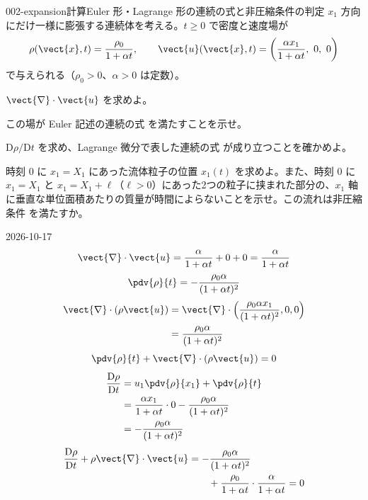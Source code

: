 \documentclass[uplatex,dvipdfmx,a4paper,11pt]{jsarticle}
\begin{document}
\begin{mondai}{002-expansion}{計算}{Euler 形・Lagrange 形の連続の式と非圧縮条件の判定}
$x_1$ 方向にだけ一様に膨張する連続体を考える。$t \ge 0$ で密度と速度場が
  \[ \rho(\vect{x},t) = \frac{\rho_0}{1+\alpha t},\qquad \vect{u}(\vect{x},t) = \left(\frac{\alpha x_1}{1+\alpha t},\ 0,\ 0\right) \]
  で与えられる（$\rho_0>0$、$\alpha>0$ は定数）。
  \begin{shoumon}
    \item $\vect{\nabla}\cdot\vect{u}$ を求めよ。
    \item この場が Euler 記述の連続の式  を満たすことを示せ。
    \item $\mathrm{D}\rho/\mathrm{D}t$ を求め、Lagrange 微分で表した連続の式  が成り立つことを確かめよ。
    \item 時刻 0 に $x_1 = X_1$ にあった流体粒子の位置 $x_1(t)$ を求めよ。また、時刻 0 に $x_1 = X_1$ と $x_1 = X_1 + \ell$（$\ell>0$）にあった2つの粒子に挟まれた部分の、$x_1$ 軸に垂直な単位面積あたりの質量が時間によらないことを示せ。この流れは非圧縮条件  を満たすか。
  \end{shoumon}
\begin{kotaeutsushi}{2026-10-17}
\[ \vect{\nabla}\cdot\vect{u}=\frac{\alpha}{1+\alpha t}+0+0=\frac{\alpha}{1+\alpha t} \]
\[ \pdv{\rho}{t}=-\frac{\rho_{0}\alpha}{(1+\alpha t)^{2}} \]
\begin{align*}
\vect{\nabla}\cdot(\rho\vect{u})&=\vect{\nabla}\cdot\Bigl(\frac{\rho_{0}\alpha x_{1}}{(1+\alpha t)^{2}},0,0\Bigr)\\
&=\frac{\rho_{0}\alpha}{(1+\alpha t)^{2}}
\end{align*}
\[ \pdv{\rho}{t}+\vect{\nabla}\cdot(\rho\vect{u})=0 \]
\begin{align*}
\frac{\mathrm{D}\rho}{\mathrm{D}t}&=u_{1}\pdv{\rho}{x_{1}}+\pdv{\rho}{t}\\
&=\frac{\alpha x_{1}}{1+\alpha t}\cdot0-\frac{\rho_{0}\alpha}{(1+\alpha t)^{2}}\\
&=-\frac{\rho_{0}\alpha}{(1+\alpha t)^{2}}
\end{align*}
\begin{align*}
\frac{\mathrm{D}\rho}{\mathrm{D}t}+\rho\vect{\nabla}\cdot\vect{u}&=-\frac{\rho_{0}\alpha}{(1+\alpha t)^{2}}\\
&\qquad+\frac{\rho_{0}}{1+\alpha t}\cdot\frac{\alpha}{1+\alpha t}=0
\end{align*}

\end{kotaeutsushi}
\end{mondai}
\end{document}
